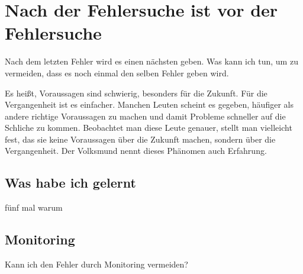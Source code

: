 \chapter{Nach der Fehlersuche ist vor der Fehlersuche}
\label{cha:ausblick}

\begin{abstractsec}
  Nach dem letzten Fehler wird es einen nächsten geben. Was kann ich tun, um
  zu vermeiden, dass es noch einmal den selben Fehler geben wird.
\end{abstractsec}

\begin{normaltext}
  Es heißt, Voraussagen sind schwierig, besonders für die Zukunft. Für die
  Vergangenheit ist es einfacher.
  Manchen Leuten scheint es gegeben, häufiger als andere richtige Voraussagen
  zu machen und damit Probleme schneller auf die Schliche zu kommen.
  Beobachtet man diese Leute genauer, stellt man vielleicht fest, das sie
  keine Voraussagen über die Zukunft machen, sondern über die Vergangenheit.
  Der Volksmund nennt dieses Phänomen auch Erfahrung.
\end{normaltext}

\section{Was habe ich gelernt}
\label{sec:was-habe-ich-gelernt}

\begin{notes}
\item fünf mal warum
\end{notes}

\section{Monitoring}
\label{sec:monitoring}

\begin{notes}
\item Kann ich den Fehler durch Monitoring vermeiden?
\end{notes}

